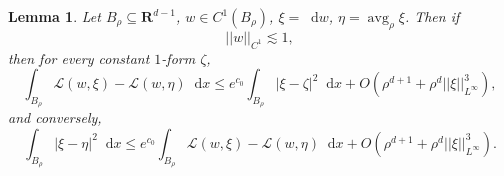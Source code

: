 \documentclass[reqno,10pt]{amsart}
\newcommand{\RR}{\mathbf{R}}
\DeclareMathOperator{\avg}{avg}
\newcommand*\dif{\mathop{}\!\mathrm{d}}
\newcommand{\Lagrange}{\mathscr L}
\newtheorem{lemma}[theorem]{Lemma}
\theoremstyle{definition}
\numberwithin{equation}{section}
\begin{document}
\begin{lemma}\label{bootstrap 1}
Let $B_\rho \subseteq \RR^{d - 1}$, $w \in C^1(B_\rho)$, $\xi = \dif w$, $\eta = \avg_\rho \xi$. Then if
$$||w||_{C^1} \lesssim 1,$$
then for every constant $1$-form $\zeta$,
\begin{equation}\label{bootstrap 1 left}
\int_{B_\rho} \Lagrange(w, \xi) - \Lagrange(w, \eta) \dif x \leq e^{c_0} \int_{B_\rho} |\xi - \zeta|^2 \dif x + O(\rho^{d + 1} + \rho^d ||\xi||_{L^\infty}^3),
\end{equation}
and conversely,
\begin{equation}\label{bootstrap 1 right}
\int_{B_\rho} |\xi - \eta|^2 \dif x \leq e^{c_0} \int_{B_\rho} \Lagrange(w, \xi) - \Lagrange(w, \eta) \dif x + O(\rho^{d + 1} + \rho^d ||\xi||_{L^\infty}^3).
\end{equation}
\end{lemma}
\end{document}
